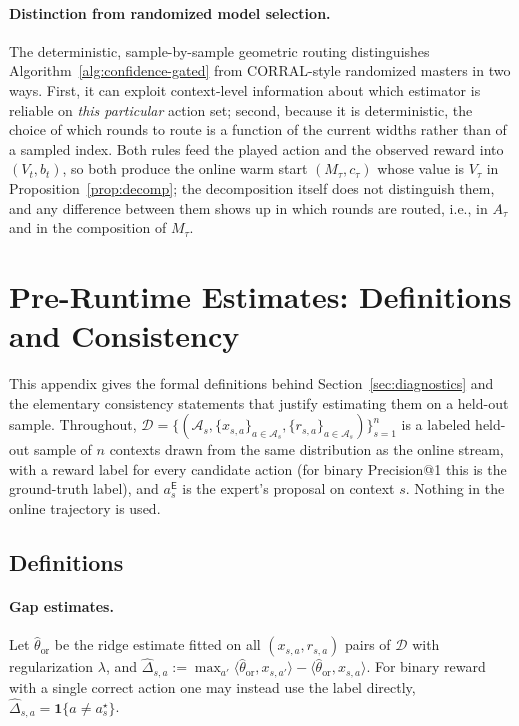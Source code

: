 \documentclass{article}
\theoremstyle{definition}
\theoremstyle{remark}
\newcommand{\ind}{\mathbf{1}}
\theoremstyle{remark}
\newcommand{\Exp}{\mathsf{E}}
\begin{document}
\paragraph{Distinction from randomized model selection.}
The deterministic, sample-by-sample geometric routing distinguishes
Algorithm~\ref{alg:confidence-gated} from CORRAL-style randomized
masters in two ways. First, it can exploit context-level information
about which estimator is reliable on \emph{this particular} action
set; second, because it is deterministic, the choice of which rounds to route
is a function of the current widths rather than of a sampled index. Both
rules feed the played action and the observed reward into $(V_t,b_t)$, so
both produce the online warm start $(M_\tau,c_\tau)$ whose value is
$V_\tau$ in Proposition~\ref{prop:decomp}; the decomposition itself does not
distinguish them, and any difference between them shows up in which rounds
are routed, i.e., in $A_\tau$ and in the composition of $M_\tau$.


\section{Pre-Runtime Estimates: Definitions and Consistency}
\label{app:diagnostics}

This appendix gives the formal definitions behind Section~\ref{sec:diagnostics}
and the elementary consistency statements that justify estimating them on a
held-out sample. Throughout, $\mathcal D=\{(\mathcal A_s,\{x_{s,a}\}_{a\in\mathcal A_s},\{r_{s,a}\}_{a\in\mathcal A_s})\}_{s=1}^{n}$
is a labeled held-out sample of $n$ contexts drawn from the same distribution
as the online stream, with a reward label for every candidate action (for
binary Precision@1 this is the ground-truth label), and $a_s^{\Exp}$ is the
expert's proposal on context $s$. Nothing in the online trajectory is used.

\subsection{Definitions}
\label{app:diag-defs}

\paragraph{Gap estimates.} Let $\widehat\theta_{\mathrm{or}}$ be the ridge
estimate fitted on all $(x_{s,a},r_{s,a})$ pairs of $\mathcal D$ with
regularization $\lambda$, and
$\widehat\Delta_{s,a}:=\max_{a'}\langle\widehat\theta_{\mathrm{or}},x_{s,a'}\rangle-\langle\widehat\theta_{\mathrm{or}},x_{s,a}\rangle$.
For binary reward with a single correct action one may instead use the label
directly, $\widehat\Delta_{s,a}=\ind\{a\ne a_s^\star\}$.
\end{document}
